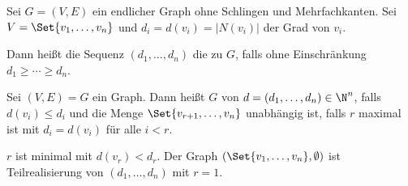 

\begin{df}
    Sei $G = (V, E)$ ein endlicher Graph ohne Schlingen und Mehrfachkanten.
    Sei $V = \Set{v_1, \dotsc, v_n}$ und $d_i = d(v_i) = |N(v_i)|$ der Grad von $v_i$.

    Dann heißt die Sequenz $(d_1, \dotsc, d_n)$ die  zu $G$, falls ohne Einschränkung $d_1 \ge \dotsb \ge d_n$.
\end{df}

\begin{df}
    Sei $(V, E) = G$ ein Graph.
    Dann heißt $G$  von $d = (d_1, \dotsc, d_n) \in \N^n$, falls $d(v_i) \le d_i$ und die Menge $\Set{v_{r+1}, \dotsc, v_n}$ unabhängig ist, falls $r$ maximal ist mit $d_i = d(v_i)$ für alle $i < r$.
    \begin{note}
        $r$ ist minimal mit $d(v_r) < d_r$.
        Der Graph $(\Set{v_1, \dotsc, v_n}, \emptyset)$ ist Teilrealisierung von $(d_1, \dotsc, d_n)$ mit $r = 1$.
    \end{note}
\end{df}




